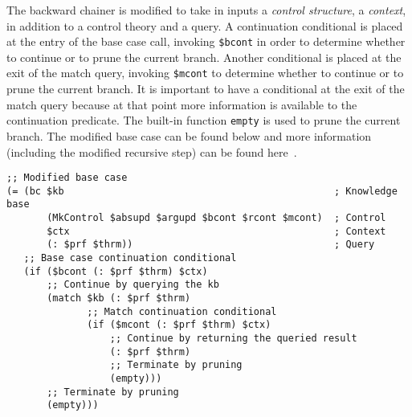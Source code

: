 \documentclass{easychair}
\begin{document}
The backward chainer is modified to take in inputs a \emph{control
structure}, a \emph{context}, in addition to a control theory and a
query.  A continuation conditional is placed at the entry of the base
case call, invoking \texttt{\$bcont} in order to determine whether to
continue or to prune the current branch.  Another conditional is
placed at the exit of the match query, invoking \texttt{\$mcont} to
determine whether to continue or to prune the current branch.  It is
important to have a conditional at the exit of the match query because
at that point more information is available to the continuation
predicate.  The built-in function \texttt{empty} is used to prune the
current branch.  The modified base case can be found below and more
information (including the modified recursive step) can be found
here~\cite{TODO}.  \small{
\begin{verbatim}
;; Modified base case
(= (bc $kb                                               ; Knowledge base
       (MkControl $absupd $argupd $bcont $rcont $mcont)  ; Control
       $ctx                                              ; Context
       (: $prf $thrm))                                   ; Query
   ;; Base case continuation conditional
   (if ($bcont (: $prf $thrm) $ctx)
       ;; Continue by querying the kb
       (match $kb (: $prf $thrm)
              ;; Match continuation conditional
              (if ($mcont (: $prf $thrm) $ctx)
                  ;; Continue by returning the queried result
                  (: $prf $thrm)
                  ;; Terminate by pruning
                  (empty)))
       ;; Terminate by pruning
       (empty)))
\end{verbatim}
}

\end{document}

